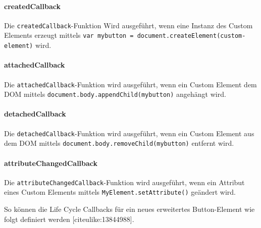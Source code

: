 \paragraph{createdCallback}\label{createdcallback}

Die \texttt{createdCallback}-Funktion Wird ausgeführt, wenn eine Instanz
des Custom Elements erzeugt mittels
\texttt{var\ mybutton\ =\ document.createElement(\textquotesingle{}custom-element\textquotesingle{})}
wird.

\paragraph{attachedCallback}\label{attachedcallback}

Die \texttt{attachedCallback}-Funktion wird ausgeführt, wenn ein Custom
Element dem DOM mittels \texttt{document.body.appendChild(mybutton)}
angehängt wird.

\paragraph{detachedCallback}\label{detachedcallback}

Die \texttt{detachedCallback}-Funktion wird ausgeführt, wenn ein Custom
Element aus dem DOM mittels \texttt{document.body.removeChild(mybutton)}
entfernt wird.

\paragraph{attributeChangedCallback}\label{attributechangedcallback}

Die \texttt{attributeChangedCallback}-Funktion wird ausgeführt, wenn ein
Attribut eines Custom Elements mittels \texttt{MyElement.setAttribute()}
geändert wird.

So können die Life Cycle Callbacks für ein neues erweitertes
Button-Element wie folgt definiert werden {[}citeulike:13844988{]}.

\begin{Shaded}
\begin{Highlighting}[]
 \OperatorTok{=} \NormalTok{(}\NormalTok{)}\OperatorTok{;}

 \OperatorTok{=} \NormalTok{() }\OperatorTok{\{}\OperatorTok{\};}
 \OperatorTok{=} \NormalTok{() }\OperatorTok{\{}\OperatorTok{\};}

 \OperatorTok{=} \NormalTok{(}\OperatorTok{,} \OperatorTok{\{}\OperatorTok{:} \OperatorTok{\}}\NormalTok{)}\OperatorTok{;}
\end{Highlighting}
\end{Shaded}

